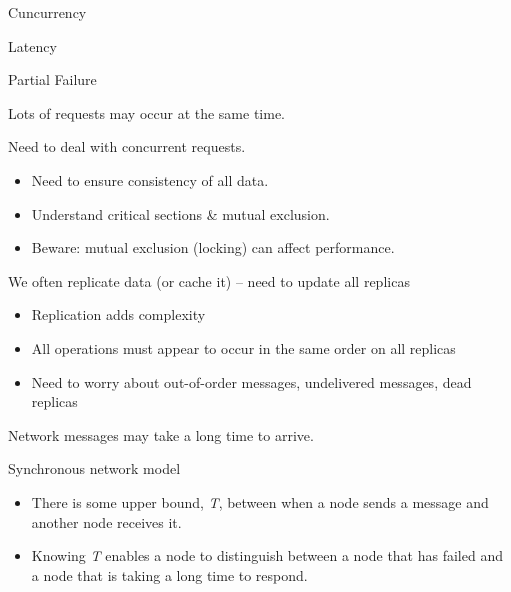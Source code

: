 \begin{slide}

	
	Cuncurrency
	\bigskip
	
	Latency
	\bigskip
	
	Partial Failure
	
\end{slide}

\begin{slide}


	Lots of requests may occur at the same time.
	\bigskip
	
	Need to deal with concurrent requests.
	\begin{itemize}
		\item Need to ensure consistency of all data.
		\item Understand critical sections \& mutual exclusion.
		\item Beware: mutual exclusion (locking) can affect performance.
	\end{itemize}
	\bigskip
	
\end{slide}

\begin{slide}


	We often replicate data (or cache it) – need to update all replicas
	\begin{itemize}
		\item Replication adds complexity
		\item All operations must appear to occur in the same order on all replicas
		\item Need to worry about out-of-order messages, undelivered messages, dead replicas
	\end{itemize}

\end{slide}

\begin{slide}

	
	Network messages may take a long time to arrive.
	\bigskip
	
	Synchronous network model
	\begin{itemize}
		\item There is some upper bound, \textit{T}, between when a node sends a message and another node receives it.
		\item Knowing \textit{T} enables a node to distinguish between a node that has failed and a node that is taking a long time to respond.
	\end{itemize}
	
\end{slide}

